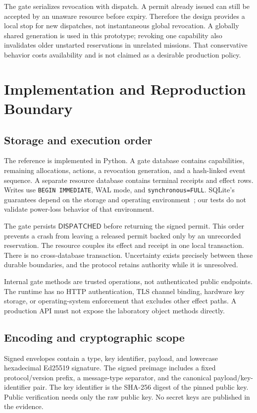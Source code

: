 \documentclass[10pt,journal,a4paper]{IEEEtran}
\newcommand{\code}[1]{\texttt{#1}}
\newcommand{\state}[1]{\ensuremath{\mathsf{#1}}}
\begin{document}
The gate serializes revocation with dispatch. A permit already issued can still be accepted by an unaware resource before expiry. Therefore the design provides a local stop for new dispatches, not instantaneous global revocation. A globally shared generation is used in this prototype; revoking one capability also invalidates older unstarted reservations in unrelated missions. That conservative behavior costs availability and is not claimed as a desirable production policy.

\section{Implementation and Reproduction Boundary}
\subsection{Storage and execution order}
The reference is implemented in Python. A gate database contains capabilities, remaining allocations, actions, a revocation generation, and a hash-linked event sequence. A separate resource database contains terminal receipts and effect rows. Writes use \code{BEGIN IMMEDIATE}, WAL mode, and \code{synchronous=FULL}. SQLite's guarantees depend on the storage and operating environment~\cite{sqlatomic,sqlwal}; our tests do not validate power-loss behavior of that environment.

The gate persists \state{DISPATCHED} before returning the signed permit. This order prevents a crash from leaving a released permit backed only by an unrecorded reservation. The resource couples its effect and receipt in one local transaction. There is no cross-database transaction. Uncertainty exists precisely between these durable boundaries, and the protocol retains authority while it is unresolved.

Internal gate methods are trusted operations, not authenticated public endpoints. The runtime has no HTTP authentication, TLS channel binding, hardware key storage, or operating-system enforcement that excludes other effect paths. A production API must not expose the laboratory object methods directly.

\subsection{Encoding and cryptographic scope}
Signed envelopes contain a type, key identifier, payload, and lowercase hexadecimal Ed25519 signature. The signed preimage includes a fixed protocol/version prefix, a message-type separator, and the canonical payload/key-identifier pair. The key identifier is the SHA-256 digest of the pinned public key. Public verification needs only the raw public key. No secret keys are published in the evidence.
\end{document}
